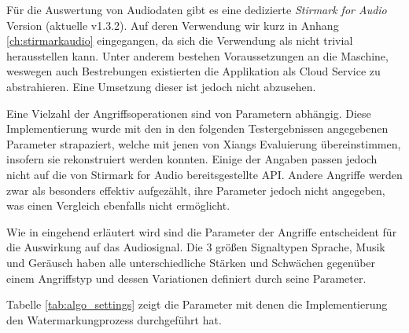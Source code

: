 Für die Auswertung von Audiodaten gibt es eine dedizierte \textit{Stirmark for Audio} Version\cite{stirmarkforaudio} (aktuelle v1.3.2). Auf deren Verwendung wir kurz in Anhang \ref{ch:stirmarkaudio} eingegangen, da sich die Verwendung als nicht trivial herausstellen kann. Unter anderem bestehen Voraussetzungen an die Maschine, weswegen auch Bestrebungen existierten die Applikation als Cloud Service zu abstrahieren\cite{petitcolas2001public}. Eine Umsetzung dieser ist jedoch nicht abzusehen. 

Eine Vielzahl der Angriffsoperationen sind von Parametern abhängig. Diese Implementierung wurde mit den in den folgenden Testergebnissen angegebenen Parameter strapaziert, welche mit jenen von Xiangs Evaluierung\cite{xiang2007robust} übereinstimmen, insofern sie rekonstruiert werden konnten. Einige der Angaben passen jedoch nicht auf die von Stirmark for Audio bereitsgestellte API. Andere Angriffe werden zwar als besonders effektiv aufgezählt, ihre Parameter jedoch nicht angegeben, was einen Vergleich ebenfalls nicht ermöglicht. 

Wie in \cite{lang2004stirmark} eingehend erläutert wird sind die Parameter der Angriffe entscheident für die Auswirkung auf das Audiosignal. Die 3 größen Signaltypen Sprache, Musik und Geräusch haben alle unterschiedliche Stärken und Schwächen gegenüber einem Angriffstyp und dessen Variationen definiert durch seine Parameter. 

Tabelle \ref{tab:algo_settings} zeigt die Parameter mit denen die Implementierung den Watermarkungprozess durchgeführt hat. 

